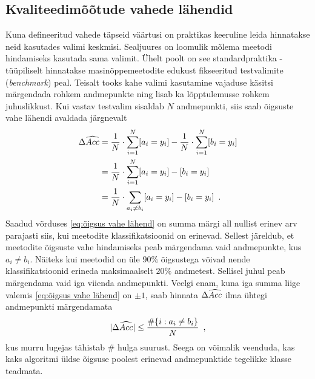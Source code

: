 \subsection{Kvaliteedimõõtude vahede lähendid}
Kuna defineeritud vahede täpseid väärtusi on praktikas keeruline leida hinnatakse neid kasutades valimi keskmisi. Sealjuures on loomulik mõlema meetodi hindamiseks kasutada sama valimit. Ühelt poolt on see standardpraktika - tüüpiliselt hinnatakse masinõppemeetodite edukust fikseeritud testvalimite (\emph{benchmark}) peal. Teisalt tooks kahe valimi kasutamine vajaduse käsitsi märgendada rohkem andmepunkte ning lisab ka lõpptulemusse rohkem juhuslikkust. Kui vastav testvalim sisaldab $N$ andmepunkti, siis saab õigsuste vahe lähendi avaldada järgnevalt
\begin{align}
    \Delta\widehat{Acc}&=\frac{1}{N}\cdot\sum_{i=1}^{N}[a_i=y_i]-\frac{1}{N}\cdot\sum_{i=1}^{N}[b_i=y_i] \nonumber\\
    &=\frac{1}{N}\cdot\sum_{i=1}^{N}[a_i=y_i]-[b_i=y_i]\nonumber\\
    &=\frac{1}{N}\cdot\sum_{a_i\neq b_i}[a_i=y_i]-[b_i=y_i] \enspace. \label{eq:õigsus vahe lähend}
\end{align}
Saadud võrduses \eqref{eq:õigsus vahe lähend} on summa märgi all nullist erinev arv parajasti siis, kui meetodite klassifikatsioonid on erinevad. Sellest järeldub, et meetodite õigsuste vahe hindamiseks peab märgendama vaid andmepunkte, kus $a_i\neq b_i$. Näiteks kui meetodid on üle $90\%$ õigsustega võivad nende klassifikatsioonid erineda maksimaalselt $20\%$ andmetest. Sellisel juhul peab märgendama vaid iga viienda andmepunkti. Veelgi enam, kuna iga summa liige valemis  \eqref{eq:õigsus vahe lähend} on $\pm 1$, saab hinnata $\Delta\widehat{Acc}$ ilma ühtegi andmepunkti märgendamata
\begin{equation}
    \label{eq:õigsus vahe lähend tõke}
    |\Delta\widehat{Acc}|\leq\frac{\#\{i: a_i\neq b_i\}}{N} \enspace,
\end{equation}
kus murru lugejas tähistab $\#$ hulga suurust. Seega on võimalik veenduda, kas kaks algoritmi üldse õigsuse poolest erinevad andmepunktide tegelikke klasse teadmata.

